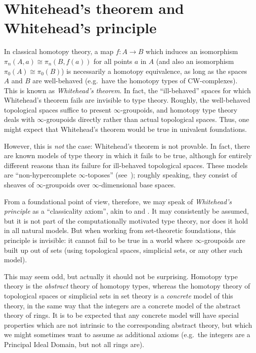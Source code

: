 %
%

\section{Whitehead's theorem and Whitehead's principle}
\label{sec:whitehead}

In classical homotopy theory, a map $f:A\to B$ which induces an isomorphism $\pi_n(A,a) \cong \pi_n(B,f(a))$ for all points $a$ in $A$ (and also an isomorphism $\pi_0(A)\cong\pi_0(B)$) is necessarily a homotopy equivalence, as long as the spaces $A$ and $B$ are well-behaved (e.g.\ have the homotopy types of CW-complexes).
%
%
This is known as \emph{Whitehead's theorem}.
In fact, the ``ill-behaved'' spaces for which Whitehead's theorem fails are invisible to type theory.
Roughly, the well-behaved topological spaces suffice to present $\infty$-groupoids,%
and homotopy type theory deals with $\infty$-groupoids directly rather than actual topological spaces.
Thus, one might expect that Whitehead's theorem would be true in univalent foundations.

However, this is \emph{not} the case: Whitehead's theorem is not provable.
In fact, there are known models of type theory in which it fails to be true, although for entirely different reasons than its failure for ill-behaved topological spaces.
These models are ``non-hypercomplete $\infty$-toposes''
%
%
(see~\cite{lurie:higher-topoi}); roughly speaking, they consist of sheaves of $\infty$-groupoids over $\infty$-dimensional base spaces.

%
%

From a foundational point of view, therefore, we may speak of \emph{Whitehead's principle} as a ``classicality axiom'', akin to \LEM{} and \choice{}.
It may consistently be assumed, but it is not part of the computationally motivated type theory, nor does it hold in all natural models.
But when working from set-theoretic foundations, this principle is invisible: it cannot fail to be true in a world where $\infty$-groupoids are built up out of sets (using topological spaces, simplicial sets, or any other such model).

This may seem odd, but actually it should not be surprising.
Homotopy type theory is the \emph{abstract} theory of homotopy types, whereas the homotopy theory of topological spaces or simplicial sets in set theory is a \emph{concrete} model of this theory, in the same way that the integers are a concrete model of the abstract theory of rings.
It is to be expected that any concrete model will have special properties which are not intrinsic to the corresponding abstract theory, but which we might sometimes want to assume as additional axioms (e.g.\ the integers are a Principal Ideal Domain, but not all rings are).

